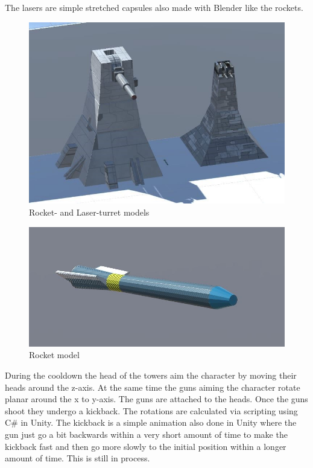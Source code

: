 \documentclass[12pt, letterpaper]{scrartcl}
\begin{document}
	The lasers are simple stretched capsules also made with Blender like the rockets.
	
	\begin{figure}[H]
		\centering
		\includegraphics[scale=0.7]{images//interim/turrets}
		\caption{Rocket- and Laser-turret models}
	\end{figure}
	
	\begin{figure}[H]
		\centering
		\includegraphics[scale=0.5]{images//interim/rocket}
		\caption{Rocket model}
	\end{figure}
	
	During the cooldown the head of the towers aim the character by moving their heads around the z-axis. At the same time the guns aiming the character rotate planar around the x to y-axis. The guns are attached to the heads. Once the guns shoot they undergo a kickback. The rotations are calculated via scripting using C\# in Unity. The kickback is a simple animation also done in Unity where the gun just go a bit backwards within a very short amount of time to make the kickback fast and then go more slowly to the initial position within a longer amount of time. This is still in process.
	
\end{document}
